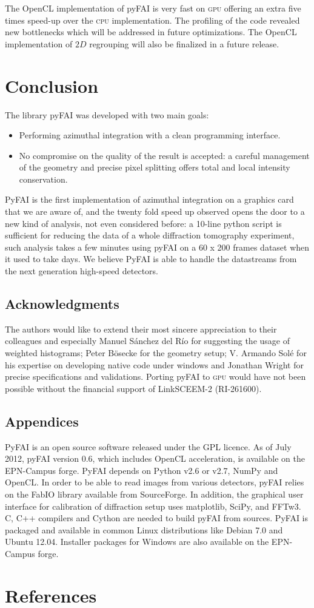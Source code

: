 \documentclass[a4paper]{jpconf}
\begin{document}
The OpenCL implementation of pyFAI is very fast on \textsc{gpu} offering an extra five
times speed-up over the \textsc{cpu} implementation. The profiling of the code revealed new
bottlenecks which will be addressed in future optimizations. The OpenCL
implementation of $2D$ regrouping will also be finalized in a future release.

\section{Conclusion}
The library pyFAI was developed with two main goals:
\begin{itemize}
\item Performing azimuthal integration with a clean programming interface.
\item No compromise on the quality of the result is accepted: a careful
management of the geometry and precise pixel splitting offers total and local intensity
conservation.
\end{itemize}
PyFAI is the first implementation of azimuthal integration on
a graphics card that we are aware of, and the twenty fold speed up observed
opens the door to a new kind of analysis, not even considered before:
a 10-line python script is sufficient for reducing the data of a whole diffraction
tomography experiment, such analysis takes a few minutes using pyFAI on
a 60 x 200 frames dataset when it used to take days.
We believe PyFAI is able to handle the datastreams from the next generation high-speed detectors.

\subsection*{Acknowledgments}
The authors would like to extend their most sincere appreciation to their
colleagues and especially Manuel S\'anchez del R\'io for suggesting
the usage of weighted histograms; Peter B\"osecke for the geometry setup;
V. Armando Sol\'e for his expertise on developing native code under windows and
Jonathan Wright for precise specifications and validations. Porting
pyFAI to \textsc{gpu} would have not been possible without the financial
support of LinkSCEEM-2 (RI-261600).

\subsection*{Appendices}
PyFAI is an open source software released under the GPL licence.
As of July 2012, pyFAI version 0.6, which includes OpenCL
acceleration, is available on the EPN-Campus forge\cite{forge}.
PyFAI depends on Python v2.6 or v2.7, NumPy\cite{numpy} and OpenCL\cite{opencl}.
In order to be able to read images from various detectors, pyFAI relies on the
FabIO\cite{fabio} library available from SourceForge.  
In addition, the graphical user interface for calibration of diffraction setup
uses matplotlib\cite{matplotlib}, SciPy\cite{scipy}, and FFTw3\cite{fftw}.
C, C++ compilers and Cython\cite{cython} are needed to build pyFAI from
sources.
PyFAI is packaged and available in common Linux distributions like Debian
7.0 and Ubuntu 12.04. Installer packages for Windows are also
available on the EPN-Campus forge.

\section*{References}


\end{document}
